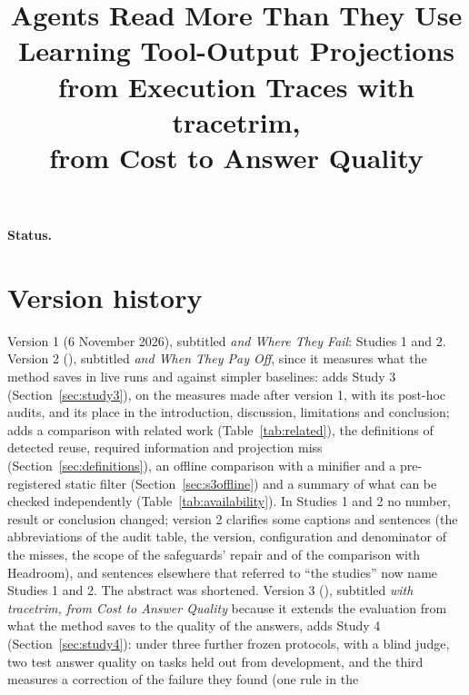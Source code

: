 \documentclass[11pt]{article}
\title{Agents Read More Than They Use\\
\large Learning Tool-Output Projections from Execution Traces with tracetrim,\\ from Cost to Answer Quality}
\author{\PaperAuthors}
\date{\PaperVersionLine}
\begin{document}
\maketitle

\begin{abstract}

\end{abstract}

\noindent\textbf{Status.} \PaperStatus













\section*{Version history}
Version 1 (6 November 2026), subtitled \emph{and Where They Fail}: Studies 1 and 2. Version 2
(\PaperVersionTwoDate), subtitled \emph{and When They Pay Off}, since it measures what the method saves in live
runs and against simpler baselines: adds Study 3
(Section~\ref{sec:study3}), on the measures made after version 1, with its post-hoc audits, and its place in the
introduction, discussion, limitations and conclusion; adds a comparison with related work
(Table~\ref{tab:related}), the definitions of detected reuse, required information and projection miss
(Section~\ref{sec:definitions}), an offline comparison with a minifier and a pre-registered static filter
(Section~\ref{sec:s3offline}) and a summary of what can be checked independently (Table~\ref{tab:availability}).
In Studies 1 and 2 no number, result or conclusion changed; version 2 clarifies some captions and sentences (the
abbreviations of the audit table, the version, configuration and denominator of the misses, the scope of the
safeguards' repair and of the comparison with Headroom), and sentences elsewhere that referred to ``the studies'' now
name Studies 1 and 2. The abstract was shortened. Version 3 (\PaperVersionThreeDate), subtitled \emph{with tracetrim, from Cost to
Answer Quality} because it extends the evaluation from what the method saves to the quality of the answers, adds
Study 4
(Section~\ref{sec:study4}): under three further frozen protocols, with a blind judge, two test answer quality on
tasks held out from development, and the third measures a correction of the failure they found (one rule in the
\end{document}
